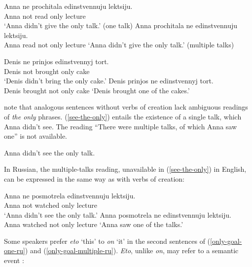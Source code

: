\documentclass{article}
\begin{document}
\begin{exe}
	\ex \label{prochitat} \begin{xlist}
		\ex \gll Anna ne prochitala edinstvennuju lektsiju.\\
		Anna not read only lecture\\
		\glt `Anna didn't give the only talk.' (one talk)
		\ex Anna prochitala ne edinstvennuju lektsiju.\\
		Anna read not only lecture
		\glt `Anna didn't give the only talk.' (multiple talks)
	\end{xlist}
	\ex \label{prinesti} \begin{xlist}
		\ex \gll Denis ne prinjos edinstvennyj tort.\\
		Denis not brought only cake\\
		\glt `Denis didn't bring the only cake.'
		\ex Denis prinjos ne edinstvennyj tort.\\
		Denis brought not only cake
		\glt `Denis brought one of the cakes.'
	\end{xlist}
\end{exe}

\citeauthor{cb2015} note that analogous sentences without verbs of creation lack ambiguous readings of \textit{the only} phrases. (\ref{see-the-only}) entails the existence of a single talk, which Anna didn't see. The reading ``There were multiple talks, of which Anna saw one'' is not available.

\begin{exe}
	\ex \label{see-the-only} Anna didn't see the only talk.
\end{exe}

In Russian, the multiple-talks reading, unavailable in (\ref{see-the-only}) in English, can be expressed in the same way as with verbs of creation:

\begin{exe}
	\ex \begin{xlist}
		\ex \gll Anna ne posmotrela edinstvennuju lektsiju.\\
		Anna not watched only lecture\\
		\glt `Anna didn't see the only talk.'
		\ex Anna posmotrela ne edinstvennuju lektsiju.\\
		Anna watched not only lecture
		\glt `Anna saw one of the talks.'
	\end{xlist}
\end{exe}

Some speakers prefer \textit{eto} `this' to \textit{on} `it' in the second sentences of (\ref{only-goal-one-ru}) and (\ref{only-goal-multiple-ru}). \textit{Eto}, unlike \textit{on}, may refer to a semantic event \citep{davidson67}:
\end{document}
